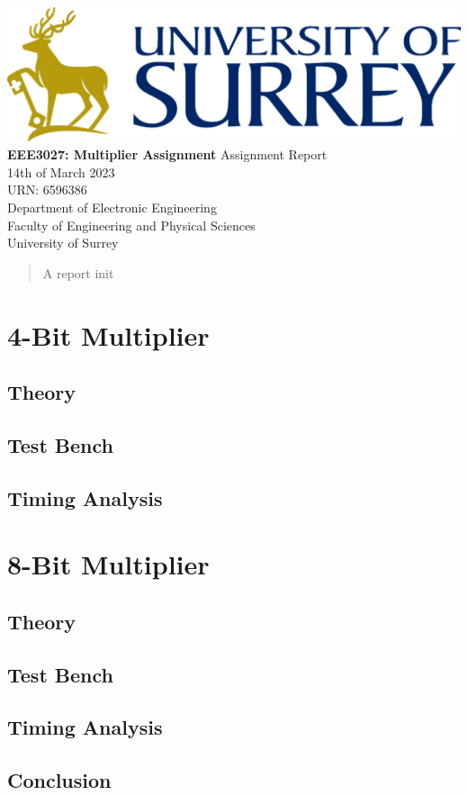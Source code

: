 \documentclass[11pt]{article}
\begin{document}
\begin{titlepage}
    \begin{center}
    \includegraphics[width=\textwidth]{Logo.png} %
    \vfill
    \Huge
    \textbf{EEE3027: Multiplier Assignment}
    \vfill
    \huge
    Assignment Report\\
    \vspace{1cm}
    \Large
    14th of March 2023\\
    URN: 6596386\\
    \vfill
    \vfill
    \Large
    Department of Electronic Engineering\\
    Faculty of Engineering and Physical Sciences\\
    University of Surrey\\
    \end{center}
\end{titlepage}

\begin{abstract}
A report init

\vspace{1cm}
\end{abstract}
\tableofcontents
\pagebreak

\section{4-Bit Multiplier}
\subsection{Theory}
\subsection{Test Bench}
\subsection{Timing Analysis}

\section{8-Bit Multiplier}
\subsection{Theory}
\subsection{Test Bench}
\subsection{Timing Analysis}

\subsection{Conclusion}
\end{document}
